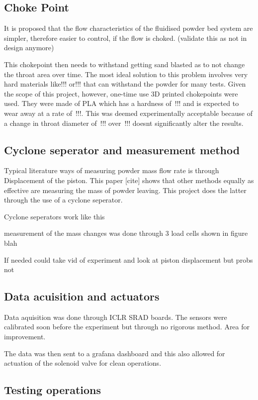\subsection{Choke Point}
It is proposed that the flow characteristics of the fluidised powder bed system are simpler, therefore easier to control, if the flow is choked. (validate this as not in design anymore)


This chokepoint then needs to withstand getting sand blasted as to not change the throat area over time. The most ideal solution to this problem involves very hard materials like!!! or!!! that can withstand the powder for many tests. Given the scope of this project, however, one-time use 3D printed chokepoints were used. They were made of PLA which has a hardness of~!!! and is expected to wear away at a rate of~!!!. This was deemed experimentally acceptable because of a change in throat diameter of~!!! over~!!! doesnt significantly alter the results.

\newpage
\subsection{Cyclone seperator and measurement method}
Typical literature ways of measuring powder mass flow rate is through Displacement of the piston. This paper [cite] shows that other methods equally as effective are measuring the mass of powder leaving. This project does the latter through the use of a cyclone seperator.

Cyclone seperators work like this

measurement of the mass changes was done through 3 load cells shown in figure blah

If needed could take vid of experiment and look at piston displacement but probs not

\subsection{Data acuisition and actuators}
Data aquisition was done through ICLR SRAD boards. The sensors were calibrated soon before the experiment but through no rigorous method. Area for improvement.

The data was then sent to a grafana dashboard and this also allowed for actuation of the solenoid valve for clean operations.

\newpage
\subsection{Testing operations}

